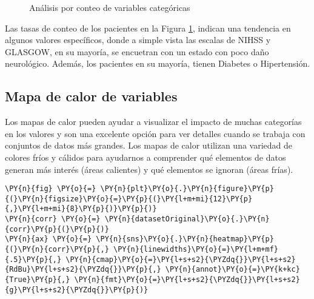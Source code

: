\begin{center}
    	\begin{figure}[H]
	\centering
	\caption{Análisis por conteo de variables categóricas}
	\label{fig:acvc}
	\end{figure}
\end{center}
    
    Las tasas de conteo de los pacientes en la Figura \ref{fig:acvc}, indican una tendencia en algunos valores específicos, donde a simple vista las escalas de NIHSS y GLASGOW, en su mayoría, se encuetran con un estado con poco daño neurológico. Además, los pacientes en su mayoría, tienen Diabetes o Hipertensión.

    \hypertarget{mapa-de-calor-de-variables}{%
\subsection{Mapa de calor de
variables}\label{mapa-de-calor-de-variables}}

	Los mapas de calor pueden ayudar a visualizar el impacto de muchas categorías en los valores y son una excelente opción para ver detalles cuando se trabaja con conjuntos de datos más grandes. Los mapas de calor utilizan una variedad de colores fríos y cálidos para ayudarnos a comprender qué elementos de datos generan más interés (áreas calientes) y qué elementos se ignoran (áreas frías).

    \begin{tcolorbox}[breakable, size=fbox, boxrule=1pt, pad at break*=1mm,colback=cellbackground, colframe=cellborder]
\begin{Verbatim}[commandchars=\\\{\}]
\PY{n}{fig} \PY{o}{=} \PY{n}{plt}\PY{o}{.}\PY{n}{figure}\PY{p}{(}\PY{n}{figsize}\PY{o}{=}\PY{p}{(}\PY{l+m+mi}{12}\PY{p}{,}\PY{l+m+mi}{8}\PY{p}{)}\PY{p}{)}
\PY{n}{corr} \PY{o}{=} \PY{n}{datasetOriginal}\PY{o}{.}\PY{n}{corr}\PY{p}{(}\PY{p}{)}
\PY{n}{ax} \PY{o}{=} \PY{n}{sns}\PY{o}{.}\PY{n}{heatmap}\PY{p}{(}\PY{n}{corr}\PY{p}{,} \PY{n}{linewidths}\PY{o}{=}\PY{l+m+mf}{.5}\PY{p}{,} \PY{n}{cmap}\PY{o}{=}\PY{l+s+s2}{\PYZdq{}}\PY{l+s+s2}{RdBu}\PY{l+s+s2}{\PYZdq{}}\PY{p}{,} \PY{n}{annot}\PY{o}{=}\PY{k+kc}{True}\PY{p}{,} \PY{n}{fmt}\PY{o}{=}\PY{l+s+s2}{\PYZdq{}}\PY{l+s+s2}{g}\PY{l+s+s2}{\PYZdq{}}\PY{p}{)}
\end{Verbatim}
\end{tcolorbox}

